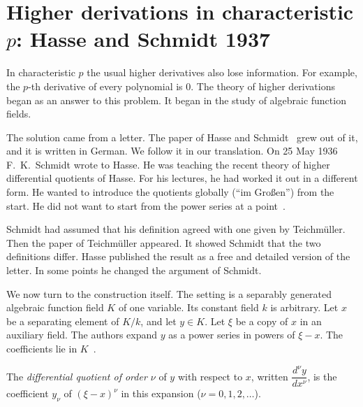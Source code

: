 \section[Higher derivations in characteristic $p$: Hasse and Schmidt 1937][Higher derivations]{Higher derivations in characteristic $p$: Hasse and Schmidt 1937}\label{sec:origins:higher-derivations}

In characteristic $p$ the usual higher derivatives also lose information. For
example, the $p$-th derivative of every polynomial is $0$. The theory of
higher derivations began as an answer to this problem. It began in the study
of algebraic function fields.

The solution came from a letter. The paper of Hasse and Schmidt~\cite{HasseSchmidt1937}
grew out of it, and it is written in German. We follow it in our translation. On 25 May 1936
F.~K.~Schmidt wrote to Hasse. He was teaching the recent theory of higher
differential quotients of Hasse. For his lectures, he had worked it out in a
different form. He wanted to introduce the quotients globally (``im
Gro\ss en'') from the start. He did not want to start from the power series
at a point~\cite[p.~215]{HasseSchmidt1937}.

Schmidt had assumed that his definition agreed with one given by
Teichm\"uller. Then the paper of Teichm\"uller appeared. It showed Schmidt
that the two definitions differ. Hasse published the result as a free and
detailed version of the letter. In some points he changed the argument of
Schmidt.

We now turn to the construction itself. The setting is a separably generated algebraic function field $K$ of one
variable. Its constant field $k$ is arbitrary. Let $x$ be a separating
element of $K/k$, and let $y \in K$. Let $\xi$ be a copy of $x$ in an
auxiliary field. The authors expand $y$ as a power series in powers of
$\xi - x$. The coefficients lie in $K$~\cite[\S 2, p.~217]{HasseSchmidt1937}.

\begin{definition}\label{def:origins:hasse-schmidt}
The \emph{differential quotient of order $\nu$} of $y$ with respect to $x$,
written $\dfrac{d^\nu y}{dx^\nu}$, is the coefficient $y_\nu$ of
$(\xi - x)^\nu$ in this expansion ($\nu = 0, 1, 2, \ldots$).
\end{definition}

